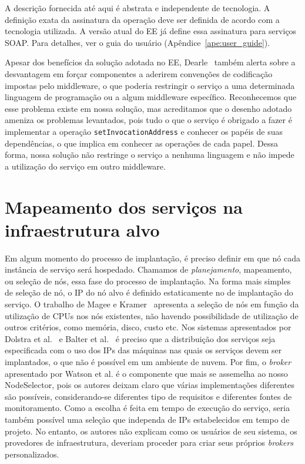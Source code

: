 A descrição fornecida até aqui é abstrata e independente de tecnologia.
A definição exata da assinatura da operação deve ser definida de acordo com a tecnologia utilizada.
A versão atual do EE já define essa assinatura para serviços SOAP.
Para detalhes, ver o guia do usuário (Apêndice~\ref{ape:user_guide}).

Apesar dos benefícios da solução adotada no EE, Dearle~\cite{Dearle2007PastPresentFuture} também alerta sobre a desvantagem em forçar componentes a aderirem convenções de codificação impostas pelo middleware, o que poderia restringir o serviço a uma determinada linguagem de programação ou a algum middleware específico. Reconhecemos que esse problema existe em nossa solução, mas acreditamos que o desenho adotado ameniza os problemas levantados, pois tudo o que o serviço é obrigado a fazer é implementar a operação \texttt{setInvocationAddress} e conhecer os papéis de suas dependências, o que implica em conhecer as operações de cada papel. Dessa forma, nossa solução não restringe o serviço a nenhuma linguagem e não impede a utilização do serviço em outro middleware.

\section{Mapeamento dos serviços na infraestrutura alvo}
\label{sec:mapeamento}

Em algum momento do processo de implantação, é preciso definir em que nó cada instância de serviço será hospedado.
Chamamos de \emph{planejamento}, mapeamento, ou seleção de nós, essa fase do processo de implantação.
Na forma mais simples de seleção de nó, o IP do nó alvo é definido estaticamente no \script de implantação do serviço.
O trabalho de Magee e Kramer~\cite{Magee1997Corba} apresenta a seleção de nós em função da utilização de CPUs nos nós existentes, não havendo possibilidade de utilização de outros critérios, como memória, disco, custo etc. Nos sistemas apresentados por Dolstra et al.~\cite{Dolstra2005Configuration} e Balter et al.~\cite{Balter1998Olan} é preciso que a distribuição dos serviços seja especificada com o uso dos IPs das máquinas nas quais os serviços devem ser implantados, o que não é possível em um ambiente de nuvem. Por fim, o \emph{broker} apresentado por Watson et al. é o componente que mais se assemelha ao nosso NodeSelector, pois os autores deixam claro que várias implementações diferentes são possíveis, considerando-se diferentes tipo de requisitos e diferentes fontes de monitoramento. Como a escolha é feita em tempo de execução do serviço, seria também possível uma seleção que independa de IPs estabelecidos em tempo de projeto. No entanto, os autores não explicam como os usuários de seu sistema, os provedores de infraestrutura, deveriam proceder para criar seus próprios \emph{brokers} personalizados.

